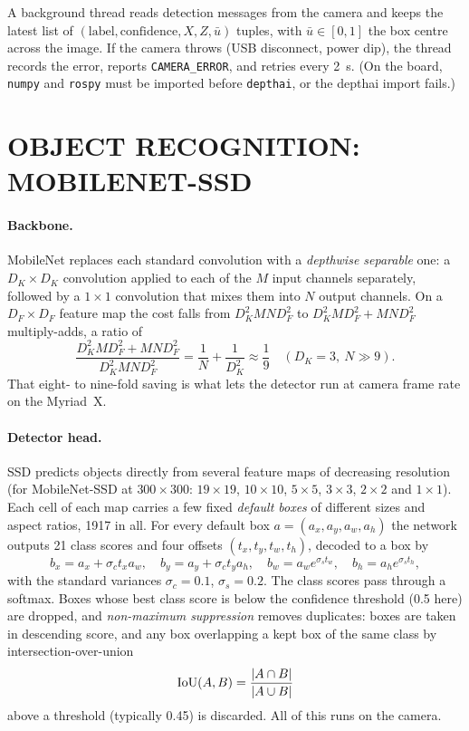 A background thread reads detection messages from the camera and keeps the
latest list of $(\text{label},\text{confidence},X,Z,\bar u)$ tuples, with
$\bar u\in[0,1]$ the box centre across the image. If the camera throws (USB
disconnect, power dip), the thread records the error, reports
\texttt{CAMERA\_ERROR}, and retries every \SI{2}{s}. (On the board,
\texttt{numpy} and \texttt{rospy} must be imported before \texttt{depthai},
or the depthai import fails.)

\section{OBJECT RECOGNITION: MOBILENET-SSD}
\label{sec:mobilenet}

\paragraph{Backbone.} MobileNet \cite{howard2017mobilenets} replaces each
standard convolution with a \emph{depthwise separable} one: a $D_K\times D_K$
convolution applied to each of the $M$ input channels separately, followed
by a $1\times1$ convolution that mixes them into $N$ output channels. On a
$D_F\times D_F$ feature map the cost falls from
$D_K^2MND_F^2$ to $D_K^2MD_F^2+MND_F^2$ multiply-adds, a ratio of
\begin{equation}
\frac{D_K^2MD_F^2+MND_F^2}{D_K^2MND_F^2}=\frac1N+\frac1{D_K^2}\approx\frac19
\quad(D_K=3,\ N\gg9).
\end{equation}
That eight- to nine-fold saving is what lets the detector run at camera
frame rate on the Myriad~X.

\paragraph{Detector head.} SSD \cite{liu2016ssd} predicts objects directly
from several feature maps of decreasing resolution (for MobileNet-SSD at
$300\times300$: $19\times19$, $10\times10$, $5\times5$, $3\times3$,
$2\times2$ and $1\times1$). Each cell of each map carries a few fixed
\emph{default boxes} of different sizes and aspect ratios, 1917 in all. For
every default box $a=(a_x,a_y,a_w,a_h)$ the network outputs 21 class scores
and four offsets $(t_x,t_y,t_w,t_h)$, decoded to a box by
\begin{equation}
b_x=a_x+\sigma_c t_x a_w,\quad
b_y=a_y+\sigma_c t_y a_h,\quad
b_w=a_w e^{\sigma_s t_w},\quad
b_h=a_h e^{\sigma_s t_h},
\end{equation}
with the standard variances $\sigma_c=0.1$, $\sigma_s=0.2$. The class scores
pass through a softmax. Boxes whose best class score is below the confidence
threshold (0.5 here) are dropped, and \emph{non-maximum suppression} removes
duplicates: boxes are taken in descending score, and any box overlapping a
kept box of the same class by intersection-over-union
\begin{equation}
\mathrm{IoU}(A,B)=\frac{\left\lvert A\cap B \right\rvert}{\left\lvert A\cup B \right\rvert}
\end{equation}
above a threshold (typically 0.45) is discarded. All of this runs on the
camera.

